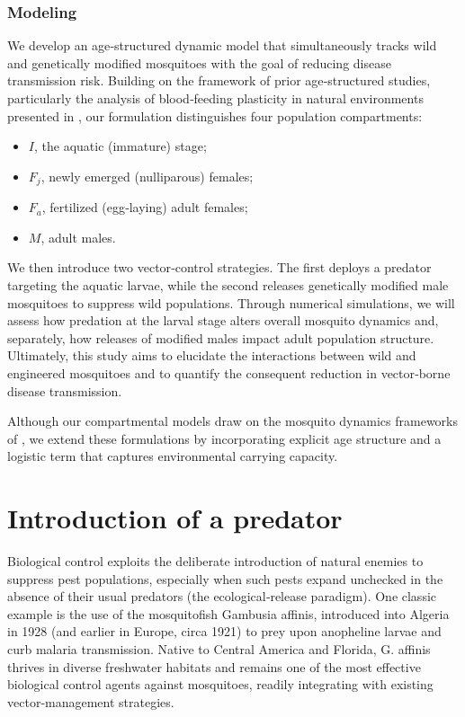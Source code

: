 \documentclass[10pt, a4paper]{amsart}
\theoremstyle{plain}
\theoremstyle{definition}
\theoremstyle{remark}
\numberwithin{equation}{section}
\begin{document}
\subsubsection{\bf Modeling}\label{s32}
We develop an age‑structured dynamic model that simultaneously tracks wild and genetically modified mosquitoes with the goal of reducing disease transmission risk. Building on the framework of prior age‑structured studies, particularly the analysis of blood‑feeding plasticity in natural environments presented in \cite{ref44}, our formulation distinguishes four population compartments:
\begin{itemize}
\item $I$, the aquatic (immature) stage;
\item $F_j$, newly emerged (nulliparous) females;
\item $F_a$, fertilized (egg‑laying) adult females;
\item $M$, adult males.
\end{itemize}

We then introduce two vector‑control strategies. The first deploys a predator targeting the aquatic larvae, while the second releases genetically modified male mosquitoes to suppress wild populations. Through numerical simulations, we will assess how predation at the larval stage alters overall mosquito dynamics and, separately, how releases of modified males impact adult population structure. Ultimately, this study aims to elucidate the interactions between wild and engineered mosquitoes and to quantify the consequent reduction in vector‑borne disease transmission.

Although our compartmental models draw on the mosquito dynamics frameworks of \cite{ref38, ref42, ref44, ref43, ref41}, we extend these formulations by incorporating explicit age structure and a logistic term that captures environmental carrying capacity.


\section*{\bf Introduction of a predator}\label{s321}
Biological control exploits the deliberate introduction of natural enemies to suppress pest populations, especially when such pests expand unchecked in the absence of their usual predators (the ecological‐release paradigm). One classic example is the use of the mosquitofish  Gambusia affinis, introduced into Algeria in 1928 (and earlier in Europe, circa 1921) to prey upon anopheline larvae and curb malaria transmission. Native to Central America and Florida,  G. affinis thrives in diverse freshwater habitats and remains one of the most effective biological control agents against mosquitoes, readily integrating with existing vector‐management strategies.
\end{document}
